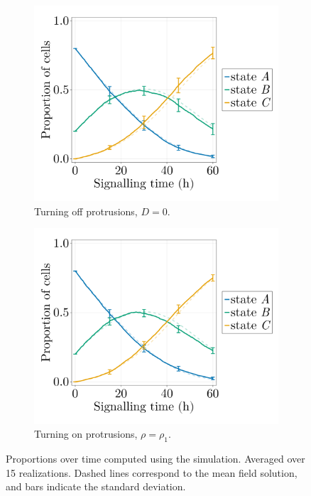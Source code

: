 \begin{figure}[ht]
    \centering
    \begin{subfigure}{0.47\textwidth}
        \centering
        \includegraphics[width=\textwidth]{figures/405/405-proportions-simulation-cellcell-fp0-15ite.png}
        \caption{Turning off protrusions, $D=0$.}
    \end{subfigure}
    \hfill
    \begin{subfigure}{0.47\textwidth}
        \centering
        \includegraphics[width=\textwidth]{figures/405/405-proportions-simulation-cellcell-fp10-15ite.png}
        \caption{Turning on protrusions, $\rho=\rho_1$.}
    \end{subfigure}
    \caption{Proportions over time computed using the simulation. Averaged over 15 realizations. Dashed lines correspond to the mean field solution, and bars indicate the standard deviation.}
    \label{fig:prop-cellcell}
\end{figure}

